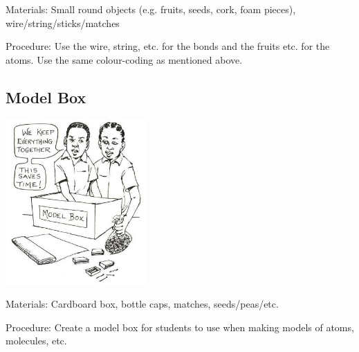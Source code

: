 \begin{multicols}{2}
\begin{description*}
\item[Materials:]{Small round objects (e.g. fruits, seeds, cork, foam pieces), wire/string/sticks/matches}
\item[Procedure:]{Use the wire, string, etc. for the bonds and the fruits etc. for the atoms. Use the same colour-coding as mentioned above.}
\end{description*}

\vfill
\columnbreak

\subsection{Model Box} 

\begin{center}
\includegraphics[width=0.4\textwidth]{./img/source/model-box.jpg}
\end{center}

\begin{description*}
\item[Materials:]{Cardboard box, bottle caps, matches, seeds/peas/etc.}
\item[Procedure:]{Create a model box for students to use when making models of atoms, molecules, etc.}
\end{description*}


\end{multicols}


\pagebreak